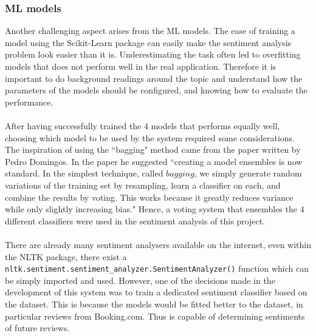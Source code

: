 \documentclass[a4paper]{report}
\newcommand{\code}[1]{\texttt{#1}}
\begin{document}
{{\subsubsection{ML models}
Another challenging aspect arises from the ML models. The ease of training a model using the Scikit-Learn package can easily make the sentiment analysis problem look easier than it is. Underestimating the task often led to overfitting models that does not perform well in the real application. Therefore it is important to do background readings around the topic and understand how the parameters of the models should be configured, and knowing how to evaluate the performance.
\\\\
After having successfully trained the 4 models that performs equally well, choosing which model to be used by the system required some considerations. The inspiration of using the “bagging" method came from the paper written by Pedro Domingos. In the paper he suggested “creating a model ensembles is now standard. In the simplest technique, called \(bagging\), we simply generate random variations of the training set by resampling, learn a classifier on each, and combine the results by voting. This works because it greatly reduces variance while only slightly increasing bias." Hence, a voting system that ensembles the 4 different classifiers were used in the sentiment analysis of this project.
\\\\
There are already many sentiment analysers available on the internet, even within the NLTK package, there exist a \code{nltk.sentiment.sentiment\_analyzer.SentimentAnalyzer()} function which can be simply imported and used. However, one of the decisions made in the development of this system was to train a dedicated sentiment classifier based on the dataset. This is because the models would be fitted better to the dataset, in particular reviews from Booking.com. Thus is capable of determining sentiments of future reviews.



}}
\end{document}
